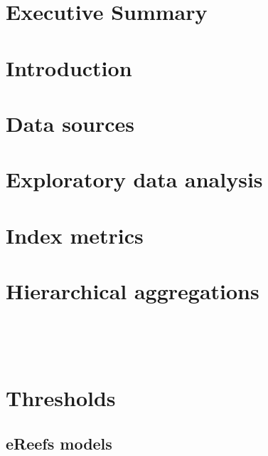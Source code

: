 \documentclass[a4paper]{AIMSreport}
\begin{document}


 
\section{Executive Summary}

\section{Introduction}

\section{Data sources}



\section{Exploratory data analysis}


 

\section{Index metrics}


 

\section{Hierarchical aggregations}


  
 
~\\[2em]



~\\[2em]
\setcounter{table}{0}
\setcounter{figure}{0}
\renewcommand{\thetable}{\Alph{section}\arabic{table}}
\renewcommand{\thefigure}{\Alph{section}\arabic{figure}}
 
   
\section{Thresholds} 

\clearpage

 

\clearpage

\begin{landscape}       
\section{eReefs models}
 

\end{landscape}  
 
\clearpage 
\end{document}
